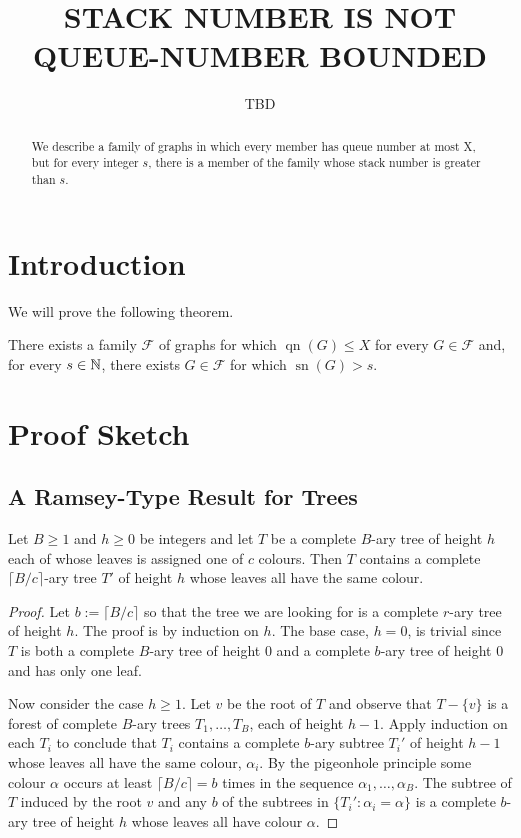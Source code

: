 \documentclass[kpfonts]{patmorin}
\title{\MakeUppercase{Stack Number is not Queue-Number Bounded}}
\author{TBD}
\DeclareMathOperator{\sn}{sn}
\DeclareMathOperator{\qn}{qn}
\begin{document}
\maketitle

\begin{abstract}
  We describe a family of graphs in which every member has queue number at most X, but for every integer $s$, there is a member of the family whose stack number is greater than $s$.
\end{abstract}

\section{Introduction}

We will prove the following theorem.

\begin{thm}
  There exists a family $\mathcal{F}$ of graphs for which $\qn(G)\le X$ for every $G\in\mathcal{F}$ and, for every $s\in\mathbb{N}$, there exists $G\in\mathcal{F}$ for which $\sn(G)>s$.
\end{thm}

\section{Proof Sketch}


\subsection{A Ramsey-Type Result for Trees}

\begin{lem}
    Let $B\ge 1$ and $h\ge 0$ be integers and let $T$ be a complete $B$-ary tree of height $h$ each of whose leaves is assigned one of $c$ colours.  Then $T$ contains a complete $\lceil B/c\rceil$-ary tree $T'$ of height $h$ whose leaves all have the same colour.
\end{lem}

\begin{proof}
    Let $b:=\lceil B/c\rceil$ so that the tree we are looking for is a complete $r$-ary tree of height $h$. The proof is by induction on $h$.  The base case, $h=0$, is trivial since $T$ is both a complete $B$-ary tree of height 0 and a complete $b$-ary tree of height 0 and has only one leaf.

    Now consider the case $h\ge 1$.  Let $v$ be the root of $T$ and observe that $T-\{v\}$ is a forest of complete $B$-ary trees $T_1,\ldots,T_B$, each of height $h-1$.  Apply induction on each $T_i$ to conclude that $T_i$ contains a complete $b$-ary subtree $T_i'$ of height $h-1$ whose leaves all have the same colour, $\alpha_i$.  By the pigeonhole principle some colour $\alpha$ occurs at least $\lceil B/c\rceil=b$ times in the sequence $\alpha_1,\ldots,\alpha_B$.  The subtree of $T$ induced by the root $v$ and any $b$ of the subtrees in $\{T_i': \alpha_i=\alpha\}$ is a complete $b$-ary tree of height $h$ whose leaves all have colour $\alpha$.
\end{proof}
\end{document}
